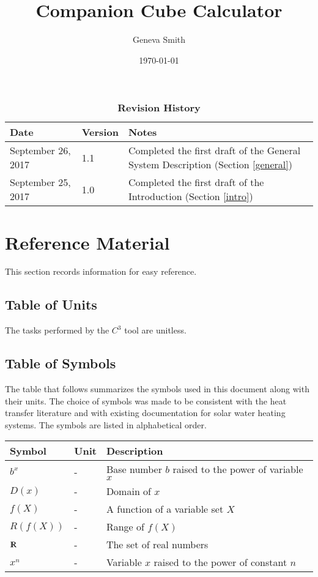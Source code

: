 \documentclass[12pt]{article}
\newcommand{\prognameAbbrv}{$C^{3}$}
\begin{document}
\title{Companion Cube Calculator} 
\author{Geneva Smith}
\date{\today}
	
\maketitle

\tableofcontents

\begin{table}[bp]
\caption{\bf Revision History}
\begin{tabularx}{\textwidth}{p{3cm}p{2cm}X}
\toprule {\bf Date} & {\bf Version} & {\bf Notes}\\
\midrule
September 26, 2017 & 1.1 & Completed the first draft of the General System 
Description (Section \ref{general})\\
September 25, 2017 & 1.0 & Completed the first draft of the Introduction 
(Section \ref{intro})\\
\bottomrule
\end{tabularx}
\end{table}

\newpage
\section{Reference Material}

This section records information for easy reference.

\subsection{Table of Units}

The tasks performed by the \prognameAbbrv{} tool are unitless.

\subsection{Table of Symbols}

The table that follows summarizes the symbols used in this document along with
their units.  The choice of symbols was made to be consistent with the heat
transfer literature and with existing documentation for solar water heating
systems.  The symbols are listed in alphabetical order.

\renewcommand{\arraystretch}{1.2}
\noindent \begin{longtable*}{l l p{12cm}} \toprule
\textbf{Symbol} & \textbf{Unit} & \textbf{Description}\\
\midrule 
$b^x$ & - & Base number $b$ raised to the power of variable $x$\\
$D(x)$ & - & Domain of $x$\\
$f(X)$ & - & A function of a variable set $X$\\
$R(f(X))$ & - & Range of $f(X)$\\
$\varmathbb{R}$ & - & The set of real numbers\\
$x^n$ & - & Variable $x$ raised to the power of constant $n$ \\
\bottomrule
\end{longtable*}
\end{document}

